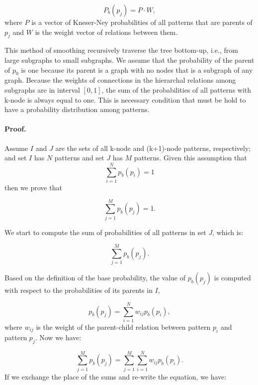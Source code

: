 \begin{equation}
P_b(p_j)  = P \cdot W,
\end{equation}
%
where $P$ is a vector of \mbox{Kneser-Ney} probabilities of all patterns that are parents of $p_j$ and $W$ is the weight vector of relations between them. 

This method of smoothing recursively traverse the tree bottom-up, i.e., from large subgraphs to small subgraphs. 
We assume that the probability of the parent of $p_0$ is one because its parent is a graph with no nodes that is a subgraph of any graph.
Because the weights of connections in the hierarchal relations among subgraphs are in interval $[0,1]$, the
sum of the probabilities of all patterns with k-node is always
equal to one. 
This is necessary condition that must be hold to have a probability distribution among patterns.  

\paragraph{Proof.} 
Assume $I$ and $J$ are the sets of all k-node and (k+1)-node
patterns, respectively; and set $I$ has $N$ patterns and set $J$ has $M$ patterns. 
Given this assumption that 
\begin{equation}
\sum_{i=1}^N p_b(p_i)=1
\end{equation}
%
then we prove that  

\begin{equation}
  \sum_{j=1}^M p_b(p_j)=1. 
\end{equation}

We start to compute the sum of probabilities of all patterns in set $J$, which is: 

\begin{equation}
  \sum_{j=1}^M p_b(p_j).
\end{equation}

Based on the definition of the base probability, the value of
$p_b(p_j)$ is computed with respect to the probabilities of its parents in $I$,

\begin{equation}
  p_b(p_j)=\sum_{i=1}^N w_{ij}p_b(p_i),
\end{equation}
where $w_{ij}$ is the weight of the \mbox{parent-child} relation between pattern $p_i$ and pattern $p_j$. 
Now we have:

\begin{equation}
\sum_{j=1}^M p_b(p_j) = \sum_{j=1}^M\sum_{i=1}^N w_{ij}p_b(p_i).
\end{equation}
%
If we exchange the place of the sums and \mbox{re-write} the equation, we have: 

